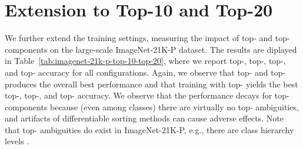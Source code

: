 \documentclass{article}
\begin{document}
\begin{table}[t]




\newpage
\appendix




\section{Extension to Top-10 and Top-20}
\label{apx:extension-10-20}

We further extend the training settings, measuring the impact of top- and top- components on the large-scale ImageNet-21K-P dataset. 
The results are diplayed in Table~\ref{tab:imagenet-21k-p-top-10-top-20}, where we report top-, top-, top-, and top- accuracy for all configurations. 
Again, we observe that  top- and  top- produces the overall best performance and that training with top- yields the best top-, top-, and top- accuracy.
We observe that the performance decays for top- components because (even among  classes) there are virtually no top- ambiguities, and artifacts of differentiable sorting methods can cause adverse effects.
Note that top- ambiguities do exist in ImageNet-21K-P, e.g., there are  class hierarchy levels \cite{ridnik2021imagenet}.



\end{table}
\end{document}

